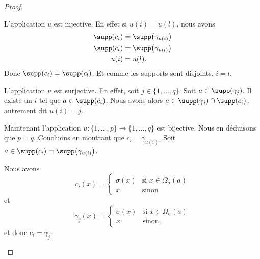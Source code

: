 \begin{proof}
\begin{subproof}
		L'application \( u\) est injective. En effet si \( u(i)=u(l)\), nous avons
		\begin{subequations}
			\begin{align}
				\supp(c_i) & =\supp\big( \gamma_{u(i)} \big) \\
				\supp(c_l) & =\supp\big( \gamma_{u(l)} \big) \\
				u(i)       & =u(l).
			\end{align}
		\end{subequations}
		Donc \( \supp(c_i)=\supp(c_l)\). Et comme les supports sont disjoints, \( i=l\).

		L'application \( u\) est surjective. En effet, soit \( j\in \{ 1,\ldots, q \}\). Soit \( a\in \supp(\gamma_j)\). Il existe un \( i\) tel que \( a\in\supp(c_i)\). Nous avons alors \( a\in\supp(\gamma_j)\cap\supp(c_i)\), autrement dit \( u(i)=j\).

		Maintenant l'application \( u\colon \{ 1,\ldots, p \}\to \{ 1,\ldots, q \}\) est bijective. Nous en déduisons que \( p=q\). Concluons en montrant que \( c_i=\gamma_{u(i)}\). Soit \( a\in\supp(c_i)=\supp\big( \gamma_{u(i)} \big)\).

		Nous avons
		\begin{equation}
			c_i(x)=\begin{cases}
				\sigma(x) & \text{si } x\in\Omega_{\sigma}(a) \\
				x         & \text{sinon }
			\end{cases}
		\end{equation}
		et
		\begin{equation}
			\gamma_j(x)=\begin{cases}
				\sigma(x) & \text{si } x\in\Omega_{\sigma}(a) \\
				x         & \text{sinon, }
			\end{cases}
		\end{equation}
		et donc \( c_i=\gamma_j\).
	\end{subproof}
\end{proof}






